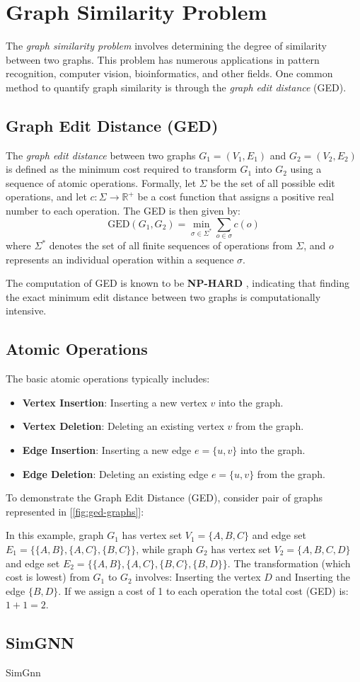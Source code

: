 \documentclass[../Thesis.tex]{subfiles}
\begin{document}
\section{Graph Similarity Problem}
\label{sec:graph_similarity_problem}
The \emph{graph similarity problem} involves determining the degree of similarity between two graphs. This problem has numerous applications in pattern recognition, computer vision, bioinformatics, and other fields. One common method to quantify graph similarity is through the \emph{graph edit distance} (GED).

\subsection{Graph Edit Distance (GED)}
The \emph{graph edit distance} between two graphs $G_1 = (V_1, E_1)$ and $G_2 = (V_2, E_2)$ is defined as the minimum cost required to transform $G_1$ into $G_2$ using a sequence of atomic operations. Formally, let $\Sigma$ be the set of all possible edit operations, and let $c: \Sigma \to \mathbb{R}^+$ be a cost function that assigns a positive real number to each operation. The GED is then given by:
\[
\text{GED}(G_1, G_2) = \min_{\sigma \in \Sigma^*} \sum_{o \in \sigma} c(o)
\]
where $\Sigma^*$ denotes the set of all finite sequences of operations from $\Sigma$, and $o$ represents an individual operation within a sequence $\sigma$.

The computation of GED is known to be \textbf{NP-HARD} \cite{NP_HARDNESS}, indicating that finding the exact minimum edit distance between two graphs is computationally intensive.

\subsection{Atomic Operations}
The basic atomic operations typically includes:
\begin{itemize}
    \item \textbf{Vertex Insertion}: Inserting a new vertex $v$ into the graph.
    \item \textbf{Vertex Deletion}: Deleting an existing vertex $v$ from the graph.
    \item \textbf{Edge Insertion}: Inserting a new edge $e = \{u, v\}$ into the graph.
    \item \textbf{Edge Deletion}: Deleting an existing edge $e = \{u, v\}$ from the graph.
\end{itemize}
To demonstrate the Graph Edit Distance (GED), consider pair of graphs represented in [\autoref{fig:ged-graphs}]:

In this example, graph $G_1$ has vertex set $V_1 = \{A, B, C\}$ and edge set $E_1 = \{\{A, B\}, \{A, C\}, \{B, C\}\}$, while graph $G_2$ has vertex set $V_2 = \{A, B, C, D\}$ and edge set $E_2 = \{\{A, B\}, \{A, C\}, \{B, C\}, \{B, D\}\}$. The transformation (which cost is lowest) from $G_1$ to $G_2$ involves: Inserting the vertex $D$ and Inserting the edge $\{B, D\}$. If we assign a cost of 1 to each operation the total cost (GED) is: $1+1=2$.

\subsection{SimGNN}
SimGnn
\end{document}
